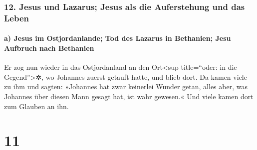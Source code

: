 \hypertarget{jesus-und-lazarus-jesus-als-die-auferstehung-und-das-leben}{%
\subsubsection{12. Jesus und Lazarus; Jesus als die Auferstehung und das
Leben}\label{jesus-und-lazarus-jesus-als-die-auferstehung-und-das-leben}}

\hypertarget{a-jesus-im-ostjordanlande-tod-des-lazarus-in-bethanien-jesu-aufbruch-nach-bethanien}{%
\paragraph{a) Jesus im Ostjordanlande; Tod des Lazarus in Bethanien;
Jesu Aufbruch nach
Bethanien}\label{a-jesus-im-ostjordanlande-tod-des-lazarus-in-bethanien-jesu-aufbruch-nach-bethanien}}

 Er zog nun wieder in das Ostjordanland an den
Ort\textless sup title=``oder: in die Gegend''\textgreater✲, wo Johannes
zuerst getauft hatte, und blieb dort.  Da kamen viele zu
ihm und sagten: »Johannes hat zwar keinerlei Wunder getan, alles aber,
was Johannes über diesen Mann gesagt hat, ist wahr gewesen.«
 Und viele kamen dort zum Glauben an ihn.

\hypertarget{section-10}{%
\section{11}\label{section-10}}

